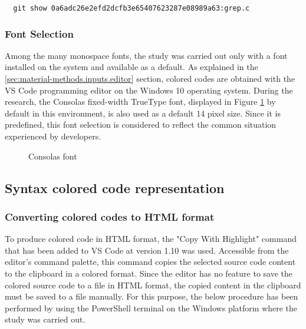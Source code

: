 \documentclass{article}
\begin{document}
\begin{verbatim}
  git show 0a6adc26e2efd2dcfb3e65407623287e08989a63:grep.c
\end{verbatim}

\subsubsection{Font Selection} \label{sec:material-methods.inputs.font}
	
Among the many monospace fonts, the study was carried out only with a font installed on the system and available as a
default. As explained in the \ref{sec:material-methods.inputs.editor} section, colored codes are obtained with the VS
Code programming editor on the Windows 10 operating system. During the research, the
Consolas\cite{microsoft2022consolas} fixed-width TrueType font, displayed in Figure \ref{fig:consolas} by default in
this environment, is also used as a default 14 pixel size. Since it is predefined, this font selection is considered to
reflect the common situation experienced by developers.

\begin{figure}[h]
  \centering
  
  \caption{Consolas font}
  \label{fig:consolas}
\end{figure}

\subsection{Syntax colored code representation}

\subsubsection{Converting colored codes to HTML format}

To produce colored code in HTML format, the "Copy With Highlight" command that has been added to VS Code at version 1.10 was used. Accessible from the editor's command palette, this command copies the selected source code content to the clipboard in a colored format. Since the editor has no feature to save the colored source code to a file in HTML format, the copied content in the clipboard must be saved to a file manually. For this purpose, the below procedure has been performed by using the PowerShell terminal on the Windows platform where the study was carried out.
\end{document}
